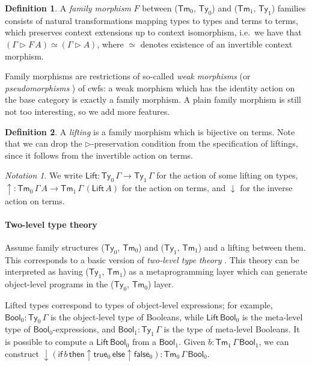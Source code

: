 \documentclass[a4paper,UKenglish,cleveref, autoref, thm-restate]{lipics-v2021}
\theoremstyle{remark}
\newtheorem{notation}{Notation}
\theoremstyle{definition}
\newtheorem{mydefinition}{Definition}
\newcommand{\Ty}{\mathsf{Ty}}
\newcommand{\Tm}{\mathsf{Tm}}
\newcommand{\ext}{\triangleright}
\newcommand{\Bool}{\mathsf{Bool}}
\newcommand{\true}{\mathsf{true}}
\newcommand{\false}{\mathsf{false}}
\newcommand{\up}{\uparrow}
\newcommand{\down}{\downarrow}
\newcommand{\Lift}{\mathsf{Lift}}
\begin{document}
\begin{mydefinition}
A \emph{family morphism} $F$ between ($\Tm_0$, $\Ty_0$) and ($\Tm_1$, $\Ty_1$)
families consists of natural transformations mapping types to types and terms to
terms, which preserves context extensions up to context isomorphism, i.e.\ we
have that $(\Gamma \ext F\,A) \simeq (\Gamma \ext A)$, where $\simeq$ denotes
existence of an invertible context morphism.
\end{mydefinition}

Family morphisms are restrictions of so-called \emph{weak morphisms}
\cite{dependentrightadjoints} (or \emph{pseudomorphisms}
\cite{kaposi2019gluing}) of cwfs: a weak morphism which has the identity action
on the base category is exactly a family morphism. A plain family morphism is
still not too interesting, so we add more features.

\begin{mydefinition}
A \emph{lifting} is a family morphism which is bijective on terms. Note that
we can drop the $\ext$-preservation condition from the specification of
liftings, since it follows from the invertible action on terms.
\end{mydefinition}

\begin{notation}
We write $\Lift : \Ty_0\,\Gamma \to \Ty_1\,\Gamma$ for the action of some lifting
on types, $\up : \Tm_0\,\Gamma\,A \to \Tm_1\,\Gamma\,(\Lift\,A)$ for the action
on terms, and $\down$ for the inverse action on terms.
\end{notation}


\paragraph{Two-level type theory}
Assume family structures ($\Ty_0$, $\Tm_0$) and ($\Ty_1$, $\Tm_1$) and a
lifting between them. This corresponds to a basic version of \emph{two-level
  type theory} \cite{twolevel}. This theory can be interpreted as having ($\Ty_1$,
$\Tm_1$) as a metaprogramming layer which can generate object-level programs in
the ($\Ty_0$, $\Tm_0$) layer.

Lifted types correspond to types of object-level expressions; for
example, $\Bool_0 : \Ty_0\,\Gamma$ is the object-level type of Booleans, while
$\Lift\,\Bool_0$ is the meta-level type of $\Bool_0$-expressions, and $\Bool_1 :
\Ty_1\,\Gamma$ is the type of meta-level Booleans. It is possible to compute a
$\Lift\,\Bool_0$ from a $\Bool_1$. Given $b : \Tm_1\,\Gamma\,\Bool_1$, we can
construct
$\down(\mathsf{if}\,b\,\mathsf{then}\up\!\true_0\,\mathsf{else}\up\!\false_0) :
\Tm_0\,\Gamma\,\Bool_0$.
\end{document}

